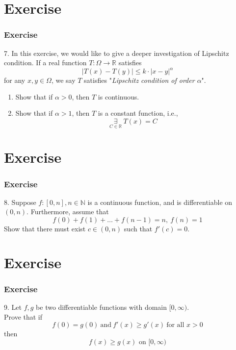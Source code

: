 \documentclass[12pt, t]{beamer}
\renewcommand{\emph}[1]{{\color{Turquoise3}\textsl{#1}}}
\begin{document}
\section{Exercise}
\begin{frame}
    \frametitle{Exercise}
    7. In this  exercise, we would like to give a deeper investigation of Lipschitz condition. If a real function $T:\Omega\rightarrow\mathbb{R}$
    satisfies
    \begin{equation*}
        |T(x)-T(y)|\leq k\cdot |x-y|^\alpha
    \end{equation*}
    for any $x,y\in \Omega$, we say $T$ satisfies "\emph{Lipschitz condition of order $\alpha$}".
    \begin{enumerate}
        \item Show that if $\alpha>0$, then $T$ is continuous.
        \item Show that if $\alpha>1$, then $T$ is a constant function, i.e.,
              \begin{equation*}
                  \underset{C\in \mathbb{R}}{\exists}\ T(x)=C
              \end{equation*}
    \end{enumerate}

\end{frame}


\section{Exercise}
\begin{frame}
    \frametitle{Exercise}
    8. Suppose $f:[0,n],n\in \mathbb{N}$ is a continuous function, and is differentiable on $(0,n)$. Furthermore, assume that
    \begin{equation*}
        f(0)+f(1)+\dots+f(n-1)=n,\ f(n)=1
    \end{equation*}
    Show that there must exist $c\in (0,n)$ such that $f'(c)=0$.

\end{frame}


\section{Exercise}
\begin{frame}
    \frametitle{Exercise}
    9. Let $f,g$ be two differentiable functions with domain $[0,\infty)$.\\
    Prove that if
    \begin{equation*}
        f(0)=g(0)\ \text{and} \ f'(x)\geq g'(x)\ \text{for all }x>0
    \end{equation*}
    then
    \begin{equation*}
        f(x)\geq g(x) \text{ on } [0,\infty)
    \end{equation*}

\end{frame}
\end{document}
